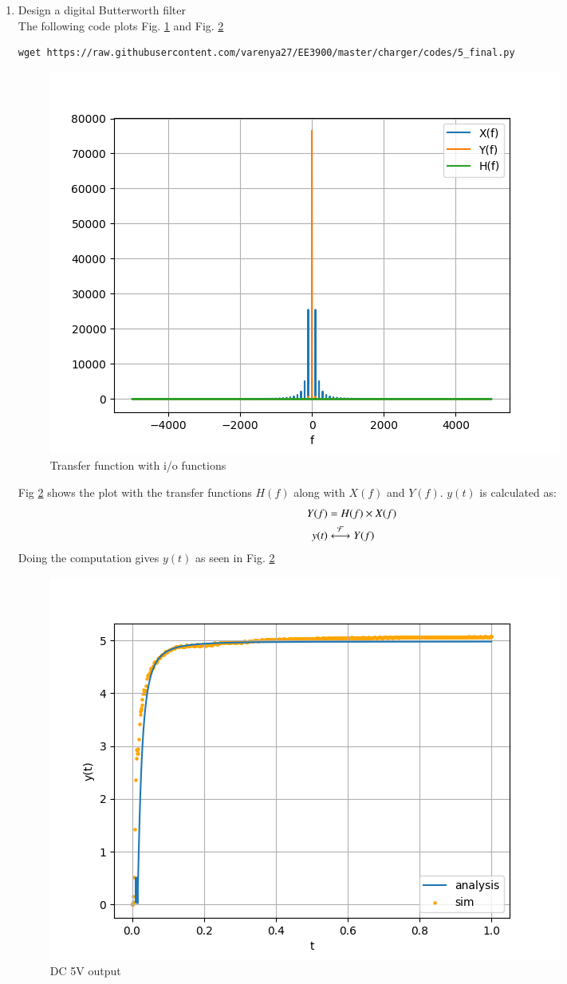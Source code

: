\documentclass[journal,12pt,twocolumn]{IEEEtran}
\renewcommand\thesection{\arabic{section}}
\begin{document}
\begin{enumerate}[label=\thesection.\arabic*
,ref=\thesection.\theenumi]
\item Design a digital Butterworth filter \\
\solution   The following code plots Fig. \ref{fig:final1} and Fig. \ref{fig:final2}
\begin{lstlisting}
wget https://raw.githubusercontent.com/varenya27/EE3900/master/charger/codes/5_final.py
\end{lstlisting}
\begin{figure}[h!]
    \centering
    \includegraphics[width=\columnwidth]{figures/butt_filt_phone_transfer.png}
    \caption{Transfer function with i/o functions}
    \label{fig:final1}
\end{figure}

Fig \ref{fig:final2} shows the plot with the transfer functions $H(f)$ along with $X(f)$ and $Y(f)$.
$y(t)$ is calculated as:
\begin{align}
    Y(f)&=H(f)\times X(f)\\
    y(t)&\overset{\mathcal{F}}{ \longleftrightarrow}Y(f)
\end{align}
Doing the computation gives $y(t)$ as seen in Fig. \ref{fig:final2}
\begin{figure}[h!]
    \centering
    \includegraphics[width=\columnwidth]{figures/butt_filt_phone.png}
    \caption{DC 5V output}
    \label{fig:final2}
\end{figure}
\end{enumerate}
\end{document}
